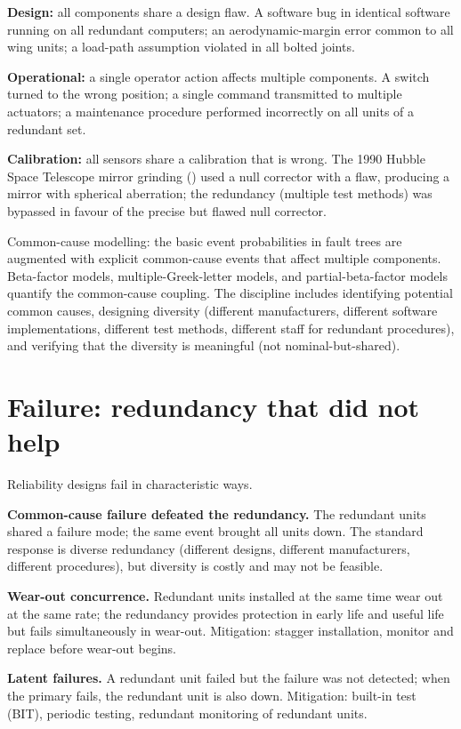 \textbf{Design:} all components share a design flaw. A software bug in identical software running on all redundant computers; an aerodynamic-margin error common to all wing units; a load-path assumption violated in all bolted joints.

\textbf{Operational:} a single operator action affects multiple components. A switch turned to the wrong position; a single command transmitted to multiple actuators; a maintenance procedure performed incorrectly on all units of a redundant set.

\textbf{Calibration:} all sensors share a calibration that is wrong. The 1990 Hubble Space Telescope mirror grinding (\cite{acc:nasa-hubble-optical-systems-1990}) used a null corrector with a flaw, producing a mirror with spherical aberration; the redundancy (multiple test methods) was bypassed in favour of the precise but flawed null corrector.

Common-cause modelling: the basic event probabilities in fault trees are augmented with explicit common-cause events that affect multiple components. Beta-factor models, multiple-Greek-letter models, and partial-beta-factor models quantify the common-cause coupling. The discipline includes identifying potential common causes, designing diversity (different manufacturers, different software implementations, different test methods, different staff for redundant procedures), and verifying that the diversity is meaningful (not nominal-but-shared).

\section{Failure: redundancy that did not help}

Reliability designs fail in characteristic ways.

\textbf{Common-cause failure defeated the redundancy.} The redundant units shared a failure mode; the same event brought all units down. The standard response is diverse redundancy (different designs, different manufacturers, different procedures), but diversity is costly and may not be feasible.

\textbf{Wear-out concurrence.} Redundant units installed at the same time wear out at the same rate; the redundancy provides protection in early life and useful life but fails simultaneously in wear-out. Mitigation: stagger installation, monitor and replace before wear-out begins.

\textbf{Latent failures.} A redundant unit failed but the failure was not detected; when the primary fails, the redundant unit is also down. Mitigation: built-in test (BIT), periodic testing, redundant monitoring of redundant units.

